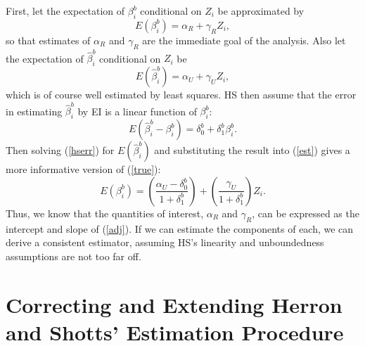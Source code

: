 \documentclass[11pt,titlepage]{article}
\begin{document}
First, let the expectation of $\beta_i^b$ conditional on $Z_i$ be
approximated by
\begin{equation}
  \label{true}
  E(\beta_i^b)=\alpha_R+\gamma_R Z_i,
\end{equation}
so that estimates of $\alpha_R$ and $\gamma_R$ are the immediate goal
of the analysis.  Also let the expectation of $\hat\beta_i^b$
conditional on $Z_i$ be
\begin{equation}
  \label{est}
  E(\hat\beta_i^b)=\alpha_U+\gamma_U Z_i,
\end{equation}
which is of course well estimated by least squares.  HS then assume
that the error in estimating $\hat\beta_i^b$ by EI is a linear
function of $\beta_i^b$:
\begin{equation}
  \label{hserr}
  E(\hat\beta_i^b - \beta_i^b) = \delta_0^b + \delta_1^b\beta_i^b.
\end{equation}
Then solving (\ref{hserr}) for $E(\hat\beta_i^b)$ and substituting the
result into (\ref{est}) gives a more informative version of (\ref{true}):
\begin{equation}
  \label{adj}
  E(\beta_i^b) = \left(\frac{\alpha_U-\delta_0^b}{1+\delta_1^b}\right)
  + \left(\frac{\gamma_U}{1+\delta_1^b}\right)Z_i.
\end{equation}
Thus, we know that the quantities of interest, $\alpha_R$ and
$\gamma_R$, can be expressed as the intercept and slope of
(\ref{adj}).  If we can estimate the components of each, we can derive
a consistent estimator, assuming HS's linearity and unboundedness
assumptions are not too far off.

\section{Correcting and Extending Herron and Shotts' Estimation
  Procedure}
\end{document}
